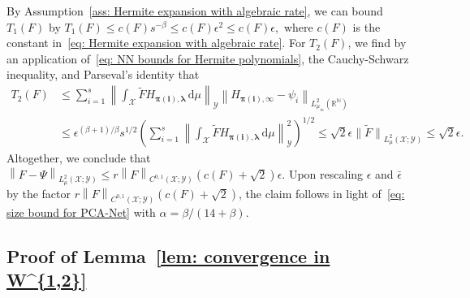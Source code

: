 \documentclass[namedate,webpdf]{ima-authoring-template-blank}
\def\D{\,\mathrm{d}}
\newcommand*{\nm}[1]{{\left\|#1\right \|}}
\newcommand*{\nmd}[1]{{\|#1\|}}    %
\numberwithin{counter}{section}
\numberwithin{equation}{section}
\theoremstyle{plain}
\theoremstyle{definition}
\newcommand*{\cX}{\mathcal{X}}
\newcommand*{\cY}{\mathcal{Y}}
\newcommand*{\bbN}{\mathbb{N}}
\newcommand*{\bbR}{\mathbb{R}}
\newcommand*{\wtF}{\widetilde{F}}
\theoremstyle{thmstyletwo}
\begin{document}
By Assumption~\ref{ass: Hermite expansion with algebraic rate}, we can bound \(T_1(F)\) by
\(
T_1(F) \leq c(F) s^{-\beta} 
\leq c(F) \epsilon^2
\leq c(F) \epsilon,
\)
where \(c(F)\) is the constant in~\eqref{eq: Hermite expansion with algebraic rate}.
For \(T_2(F)\), we find by an application of~\eqref{eq: NN bounds for Hermite polynomials}, the Cauchy-Schwarz inequality, and Parseval's identity that
\begin{align*}
    T_2(F) &\leq \sum_{i = 1}^s \nm{\int_{\cX} \wtF H_{\bm{\pi(i)}, \bm{\lambda}} \D \mu}_{\cY} \nm{H_{\bm{\pi(i)}, \infty} - \psi_i}_{L_{\mu_{\infty}}^2 (\bbR^{\bbN})} \\
    &\leq \epsilon^{(\beta + 1)/\beta} s^{1/2} \left( \sum_{i = 1}^s \nm{\int_{\cX} \wtF H_{\bm{\pi(i)}, \bm{\lambda}} \D \mu}_{\cY}^2 \right)^{1/2} 
    \leq \sqrt{2} \epsilon \nmd{\wtF}_{L_{\mu}^2(\cX; \cY)} 
    \leq \sqrt{2} \epsilon.
\end{align*}
Altogether, we conclude that
\(
\nm{F - \Psi}_{L_{\mu}^2(\cX; \cY)}
\leq r \nm{F}_{C^{0, 1}(\cX; \cY)} (c(F) + \sqrt{2}) \epsilon.
\)
Upon rescaling \(\epsilon\) and \(\bar{\epsilon}\) by the factor \(r \nm{F}_{C^{0, 1}(\cX; \cY)} (c(F) + \sqrt{2})\), the claim follows in light of~\eqref{eq: size bound for PCA-Net} with \(\alpha = \beta / (14 + \beta)\). \hfill \qedsymbol{}



\subsection{Proof of Lemma~\ref{lem: convergence in W^{1,2}}}
\label{subsec: app: proof convergence}
\end{document}
